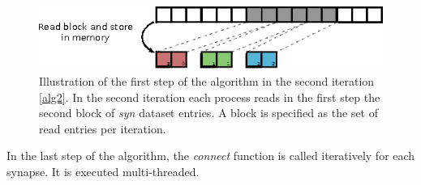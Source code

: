 \begin{figure}[ht!]
\centering
\includegraphics[scale=2.0]{pictures/import_syn_vis_second_it.eps}
\caption{Illustration of the first step of the algorithm in the second iteration \ref{alg2}.
In the second iteration each process reads in the first step the second block of \emph{syn} dataset entries.
A block is specified as the set of read entries per iteration.}
\label{fig:importsynvis2nd}
\end{figure}
\newpage
In the last step of the algorithm, the \emph{connect} function is called iteratively for each synapse.
It is executed multi-threaded.

